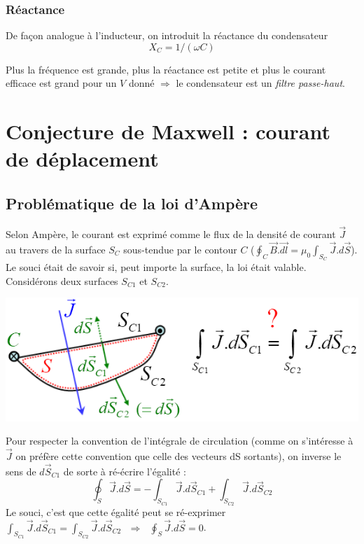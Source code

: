 \documentclass	[11pt, a4paper, openany]{book}
\begin{document}
	\subsubsection*{Réactance}
	De façon analogue à l'inducteur, on introduit la réactance du condensateur \begin{equation}
	X_C = 1/(\omega C)
	\end{equation}
	
	Plus la fréquence est grande, plus la réactance est petite et plus le courant efficace est grand pour un $V$ donné $\Rightarrow$ le condensateur est un \textit{filtre passe-haut}.
	
	\section{Conjecture de Maxwell : courant de déplacement}
	\subsection{Problématique de la loi d'Ampère}
	Selon Ampère, le courant est exprimé comme le flux de la densité de courant $\vec{J}$ au travers de la surface $S_C$ sous-tendue par le contour $C$ ($\oint_C \vec{B}.\vec{dl} = \mu_0 \int_{S_C} \vec{J}.d\vec{S}$).\\
	Le souci était de savoir si, peut importe la surface, la loi était valable. Considérons deux surfaces $S_{C1}$ et $S_{C2}$.
	
	\begin{center}
		\includegraphics[scale=0.55]{em/image27.png}\\
	\end{center}
	Pour respecter la convention de l'intégrale de circulation (comme on s'intéresse à $\vec{J}$ on préfère cette convention que celle des vecteurs dS sortants), on inverse le sens de $d\vec{S}_{C1}$ de sorte à ré-écrire l'égalité :
	\begin{equation}
		\oint_S \vec{J}.d\vec{S} = - \int_{S_{C1}} \vec{J}.d\vec{S}_{C1} + \int_{S_{C2}} \vec{J}.d\vec{S}_{C2} 
	\end{equation}
	Le souci, c'est que cette égalité peut se ré-exprimer  $\int_{S_{C1}} \vec{J}.d\vec{S}_{C1} = \int_{S_{C2}} \vec{J}.d\vec{S}_{C2}\ \ \ \Rightarrow\ \ \ \oint_S \vec{J}.d\vec{S} = 0$.\\
	
\end{document}
